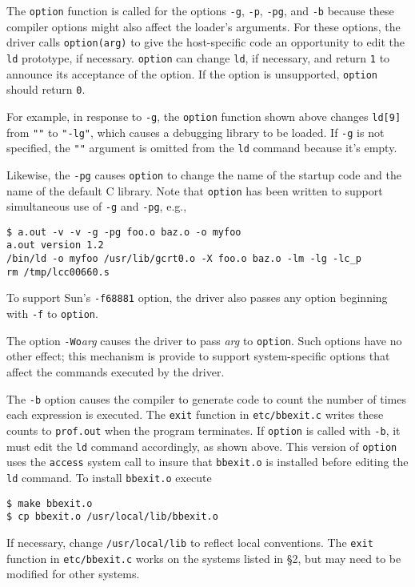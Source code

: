 The \verb|option| function is called for the options
\verb|-g|, \verb|-p|, \verb|-pg|, and \verb|-b| because these compiler options might
also affect the loader's arguments. For these options,
the driver calls \verb|option(arg)| to give the host-specific
code an opportunity to edit the \verb|ld| prototype, if necessary.
\verb|option| can change \verb|ld|, if necessary, and return \verb|1| to
announce its acceptance of the option. If the option
is unsupported, \verb|option| should return \verb|0|.

For example, in response to \verb|-g|, the \verb|option| function shown above
changes \verb|ld[9]| from \verb|""| to \verb|"-lg"|, which causes
a debugging library to be loaded. If \verb|-g| is not specified,
the \verb|""| argument is omitted from the \verb|ld| command
because it's empty.

Likewise, the \verb|-pg| causes \verb|option| to change the name
of the startup code and the name of the default C library. Note that
\verb|option| has been written to support simultaneous use
of \verb|-g| and \verb|-pg|, e.g.,
\begin{verbatim}
$ a.out -v -v -g -pg foo.o baz.o -o myfoo
a.out version 1.2
/bin/ld -o myfoo /usr/lib/gcrt0.o -X foo.o baz.o -lm -lg -lc_p
rm /tmp/lcc00660.s
\end{verbatim}

To support Sun's \verb|-f68881| option, the driver also
passes any option beginning with \verb|-f| to \verb|option|.

The option \verb|-Wo|{\it arg\/} causes the driver to pass {\it arg\/}
to \verb|option|. Such options have no other effect; this mechanism
is provide to support system-specific options that affect the
commands executed by the driver.

The \verb|-b| option causes the compiler to generate
code to count the number of times each expression is executed.
The \verb|exit| function in \verb|etc/bbexit.c| writes these
counts to \verb|prof.out| when the program terminates.
If \verb|option| is called with \verb|-b|,
it must edit the \verb|ld| command accordingly,
as shown above. This version of \verb|option| uses
the \verb|access| system call to insure that \verb|bbexit.o| is installed before
editing the \verb|ld| command. To install \verb|bbexit.o| execute
\begin{verbatim}
$ make bbexit.o
$ cp bbexit.o /usr/local/lib/bbexit.o
\end{verbatim}
If necessary, change \verb|/usr/local/lib| to reflect local conventions.
The \verb|exit| function in \verb|etc/bbexit.c| works on the
systems listed in \S2, but may need to be modified for other systems.

